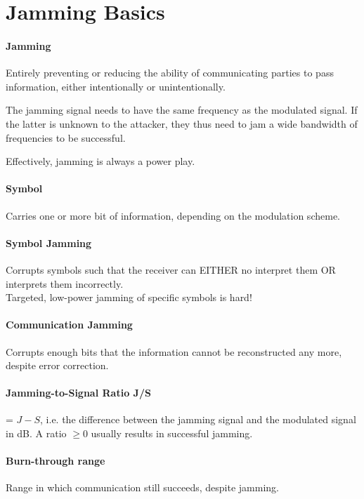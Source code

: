 \section{Jamming Basics}

\paragraph{Jamming}
Entirely preventing or reducing the ability of communicating parties to pass information, either intentionally or unintentionally.

The jamming signal needs to have the same frequency as the modulated signal.
If the latter is unknown to the attacker, they thus need to jam a wide bandwidth of frequencies to be successful.

Effectively, jamming is always a power play.

\paragraph{Symbol}
Carries one or more bit of information, depending on the modulation scheme.

\paragraph{Symbol Jamming}
Corrupts symbols such that the receiver can EITHER no interpret them OR interprets them incorrectly.\\
Targeted, low-power jamming of specific symbols is hard!

\paragraph{Communication Jamming}
Corrupts enough bits that the information cannot be reconstructed any more, despite error correction.

\paragraph{Jamming-to-Signal Ratio J/S} = $J -  S$, i.e. the difference between the jamming signal and the modulated signal in dB.
A ratio $\geq 0$ usually results in successful jamming.

\paragraph{Burn-through range}
Range in which communication still succeeds, despite jamming.

